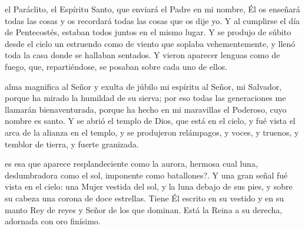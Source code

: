 \documentclass[10pt,twoside]{book}
\begin{document}


\vspace{5mm}

\noindent{}
el Paráclito, el Espíritu Santo, que enviará el Padre en mi nombre, Él os enseñará todas las cosas y os recordará todas las cosas que os dije yo.
Y al cumplirse el día de Pentecostés, estaban todos juntos en el mismo lugar. Y se produjo de súbito desde el cielo un estruendo como de viento que soplaba vehementemente,
y llenó toda la casa donde se hallaban sentados. Y vieron aparecer lenguas como de fuego, que, repartiéndose, se posaban sobre cada uno de ellos.

\vspace{2mm}



\vspace{5mm}

\noindent{}
alma magnifica al Señor y exulta de júbilo mi espíritu al Señor, mi Salvador, porque ha mirado la humildad de su sierva;
por eso todas las generaciones me llamarán bienaventurada, porque ha hecho en mi maravillas el Poderoso, cuyo nombre es santo. Y se abrió el templo de Dios, que está en el cielo,
y fué vista el arca de la alianza en el templo, y se produjeron relámpagos, y voces, y truenos, y temblor de tierra, y fuerte granizada.

\vspace{2mm}



\vspace{5mm}

\noindent{}
es esa que aparece resplandeciente como la aurora, hermosa cual luna, deslumbradora como el sol, imponente como batallones?.
Y una gran señal fué vista en el cielo: una Mujer vestida del sol, y la luna debajo de sus  pies, y sobre su cabeza una corona de doce estrellas.
Tiene Él escrito en su vestido y en su manto Rey de reyes y Señor de los que dominan. Está la Reina a su derecha, adornada con oro finísimo.
\end{document}
